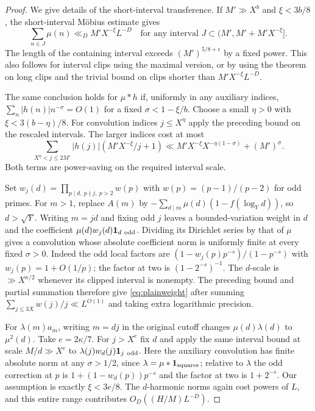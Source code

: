 \documentclass[11pt]{article}
\theoremstyle{remark}\newtheorem{remark}[theorem]{Remark}
\begin{document}
\begin{proof}
We give details of the short-interval transference. If \(M'\gg X^b\)
and \(\xi<3b/8\), the short-interval M\"obius estimate
\cite[Theorem~1.1(i)]{MSTTshort} gives
\[
 \sum_{n\in J}\mu(n)\ll_D M'X^{-\xi}L^{-D}
 \quad\text{for any interval }J\subset(M',M'+M'X^{-\xi}].
\]
The length of the containing interval exceeds \((M')^{5/8+\epsilon}\)
by a fixed power. This also follows for interval clips using the
maximal version, or by using the theorem on long clips and the trivial
bound on clips shorter than \(M'X^{-\xi}L^{-D}\).

The same conclusion holds for \(\mu*h\) if, uniformly in any
auxiliary indices, \(\sum_n|h(n)|n^{-\sigma}=O(1)\) for a fixed
\(\sigma<1-\xi/b\). Choose a small \(\eta>0\) with
\(\xi<3(b-\eta)/8\). For convolution indices \(j\le X^\eta\)
apply the preceding bound on the rescaled intervals. The larger indices
cost at most
\[
 \sum_{X^\eta<j\le2M'}|h(j)|(M'X^{-\xi}/j+1)
 \ll M'X^{-\xi}X^{-\eta(1-\sigma)}+(M')^\sigma .
\]
Both terms are power-saving on the required interval scale.

Set \(w_j(d)=\prod_{p\mid d,\ p\nmid j,\ p>2}w(p)\) with
\(w(p)=(p-1)/(p-2)\) for odd primes. For \(m>1\), replace \(A(m)\) by
\(-\sum_{d\mid m}\mu(d)(1-f(\log_Y d))\), so \(d>\sqrt Y\).
Writing \(m=jd\) and fixing odd \(j\) leaves a bounded-variation
weight in \(d\) and the coefficient
\(\mu(d)w_j(d)\mathbf1_{d\ {\rm odd}}\).
Dividing its Dirichlet series by that of \(\mu\) gives a convolution
whose absolute coefficient norm is uniformly finite at every fixed
\(\sigma>0\). Indeed the odd local factors are
\((1-w_j(p)p^{-s})/(1-p^{-s})\) with \(w_j(p)=1+O(1/p)\);
the factor at two is \((1-2^{-s})^{-1}\).
The \(d\)-scale is \(\gg X^{\kappa/2}\) whenever its clipped interval
is nonempty. The preceding bound and partial summation therefore
give \eqref{eq:plainweight} after summing
\(\sum_{j\le3X}w(j)/j\ll L^{O(1)}\) and taking extra logarithmic precision.

For \(\lambda(m)a_m\), writing \(m=dj\) in the original cutoff
changes \(\mu(d)\lambda(d)\) to \(\mu^2(d)\).
Take \(e=2\kappa/7\). For \(j>X^e\) fix \(d\) and apply the same
interval bound at scale \(M/d\gg X^e\) to
\(\lambda(j)w_d(j)\mathbf1_{j\ {\rm odd}}\).
Here the auxiliary convolution has finite absolute norm at any
\(\sigma>1/2\), since \(\lambda=\mu*\mathbf1_{\rm squares}\);
relative to \(\lambda\) the odd correction at \(p\) is
\(1+(1-w_d(p))p^{-s}\) and the factor at two is \(1+2^{-s}\).
Our assumption is exactly \(\xi<3e/8\). The \(d\)-harmonic norms
again cost powers of \(L\), and this entire range contributes
\(O_D((H/M)L^{-D})\).


\end{proof}
\end{document}

